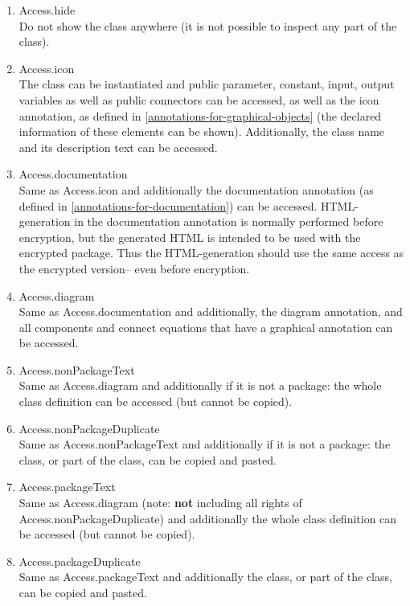 \begin{enumerate}
\item
  Access.hide\\
  Do not show the class anywhere (it is not possible to inspect any part
  of the class).
\item
  Access.icon\textbf{\\
  }The class can be instantiated and public parameter, constant, input,
  output variables as well as public connectors can be accessed, as well
  as the icon annotation, as defined in \ref{annotations-for-graphical-objects} (the declared
  information of these elements can be shown). Additionally, the class
  name and its description text can be accessed.
\item
  Access.documentation\\
  Same as Access.icon and additionally the documentation annotation (as
  defined in \ref{annotations-for-documentation}) can be accessed. HTML-generation in the
  documentation annotation is normally performed before encryption, but
  the generated HTML is intended to be used with the encrypted package.
  Thus the HTML-generation should use the same access as the encrypted
  version-- even before encryption.
\item
  Access.diagram\\
  Same as Access.documentation and additionally, the diagram annotation,
  and all components and connect equations that have a graphical
  annotation can be accessed.
\item
  Access.nonPackageText\\
  Same as Access.diagram and additionally if it is not a package: the
  whole class definition can be accessed (but cannot be copied).
\item
  Access.nonPackageDuplicate\\
  Same as Access.nonPackageText and additionally if it is not a package:
  the class, or part of the class, can be copied and pasted.
\item
  Access.packageText\\
  Same as Access.diagram (note: \textbf{not} including all rights of
  Access.nonPackageDuplicate) and additionally the whole class
  definition can be accessed (but cannot be copied).
\item
  Access.packageDuplicate\\
  Same as Access.packageText and additionally the class, or part of the
  class, can be copied and pasted.
\end{enumerate}

